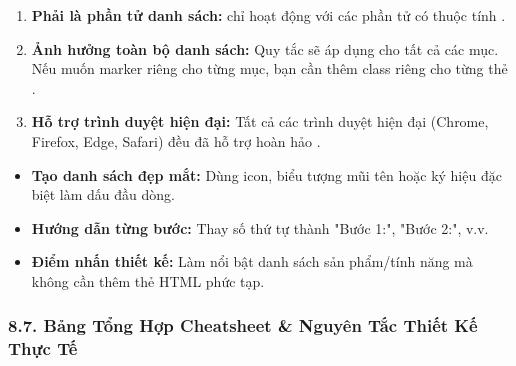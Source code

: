 \begin{warnBox}
\begin{enumerate}[leftmargin=1.5em, itemsep=3pt, parsep=0pt]
    \item \textbf{Phải là phần tử danh sách:}  chỉ hoạt động với các phần tử có thuộc tính .
    \item \textbf{Ảnh hưởng toàn bộ danh sách:} Quy tắc  sẽ áp dụng cho tất cả các mục. Nếu muốn marker riêng cho từng mục, bạn cần thêm class riêng cho từng thẻ .
    \item \textbf{Hỗ trợ trình duyệt hiện đại:} Tất cả các trình duyệt hiện đại (Chrome, Firefox, Edge, Safari) đều đã hỗ trợ hoàn hảo .
\end{enumerate}
\end{warnBox}

\begin{conceptBox}
\begin{itemize}[leftmargin=1.5em, itemsep=2pt, parsep=0pt]
    \item \textbf{Tạo danh sách đẹp mắt:} Dùng icon, biểu tượng mũi tên hoặc ký hiệu đặc biệt làm dấu đầu dòng.
    \item \textbf{Hướng dẫn từng bước:} Thay số thứ tự thành "Bước 1:", "Bước 2:", v.v.
    \item \textbf{Điểm nhấn thiết kế:} Làm nổi bật danh sách sản phẩm/tính năng mà không cần thêm thẻ HTML phức tạp.
\end{itemize}
\end{conceptBox}

\subsubsection{8.7. Bảng Tổng Hợp Cheatsheet \& Nguyên Tắc Thiết Kế Thực Tế}

